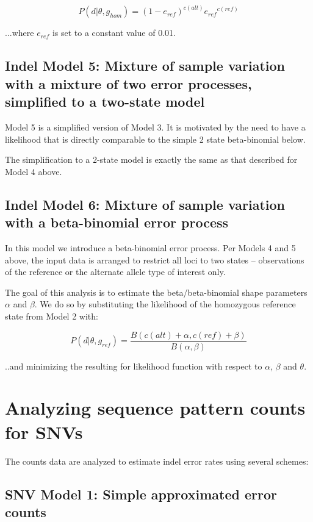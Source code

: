 \documentclass{article}
\begin{document}
\begin{equation*}
P (d \vert \theta, g_{hom}) = (1-e_{ref})^{c(alt)} {e_{ref}}^{c(ref)}
\end{equation*}

...where $e_{ref}$ is set to a constant value of 0.01.

\subsection{Indel Model 5: Mixture of sample variation with a mixture of two error processes, simplified to a two-state model}

Model 5 is a simplified version of Model 3. It is motivated by the need to have a likelihood that is directly comparable to the simple 2 state beta-binomial below.

The simplification to a 2-state model is exactly the same as that described for Model 4 above.

\subsection{Indel Model 6: Mixture of sample variation with a beta-binomial error process}

In this model we introduce a beta-binomial error process. Per Models 4 and 5 above, the input data is arranged to restrict all loci to two states -- observations of the reference or the alternate allele type of interest only.

The goal of this analysis is to estimate the beta/beta-binomial shape parameters $\alpha$ and $\beta$. We do so by substituting the likelihood of the homozygous reference state from Model 2 with:

\begin{equation}
P ( d \vert \theta, g_{ref}) = \frac{B(c(alt)+\alpha,c(ref)+\beta)}{B(\alpha,\beta)}
\end{equation}

..and minimizing the resulting for likelihood function with respect to $\alpha$, $\beta$ and $\theta$.


\section{Analyzing sequence pattern counts for SNVs}

The counts data are analyzed to estimate indel error rates using several schemes:

\subsection{SNV Model 1: Simple approximated error counts}
\end{document}
